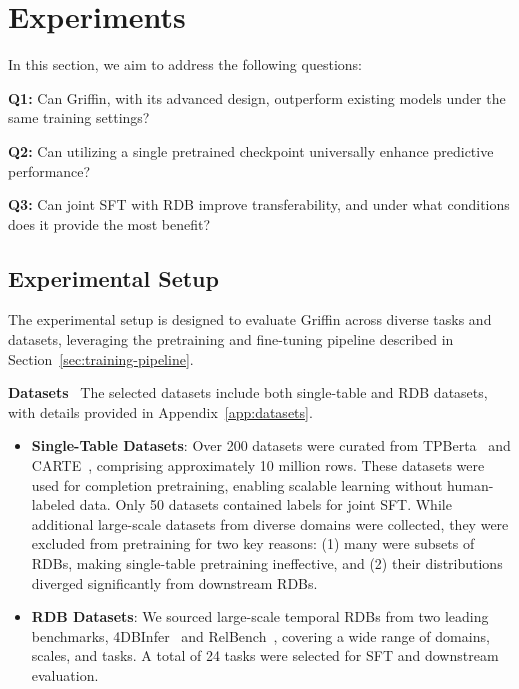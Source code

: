 \documentclass{article}
\theoremstyle{plain}
\theoremstyle{definition}
\theoremstyle{remark}
\begin{document}
\section{Experiments}

In this section, we aim to address the following questions:  

\textbf{Q1:} Can Griffin, with its advanced design, outperform existing models under the same training settings?  
\vspace{-0.1cm}

\textbf{Q2:} Can utilizing a single pretrained checkpoint universally enhance predictive performance?  
\vspace{-0.1cm}

\textbf{Q3:} Can joint SFT with RDB improve transferability, and under what conditions does it provide the most benefit?  
\vspace{-0.1cm}

\vspace*{-0.1cm}
\subsection{Experimental Setup}

The experimental setup is designed to evaluate Griffin across diverse tasks and datasets, leveraging the pretraining and fine-tuning pipeline described in Section~\ref{sec:training-pipeline}. 

\textbf{Datasets}~
The selected datasets include both single-table and RDB datasets, with details provided in Appendix~\ref{app:datasets}.  
\begin{itemize}[itemsep=2pt,topsep=-2pt,parsep=0pt,leftmargin=10pt]
    \item \textbf{Single-Table Datasets}: Over 200 datasets were curated from TPBerta~\citep{yan2024making} and CARTE~\cite{kim2024carte}, comprising approximately 10 million rows. These datasets were used for completion pretraining, enabling scalable learning without human-labeled data. Only 50 datasets contained labels for joint SFT. While additional large-scale datasets from diverse domains were collected, they were excluded from pretraining for two key reasons: (1) many were subsets of RDBs, making single-table pretraining ineffective, and (2) their distributions diverged significantly from downstream RDBs.  
    \item \textbf{RDB Datasets}: We sourced large-scale temporal RDBs from two leading benchmarks, 4DBInfer~\cite{wang20244dbinfer} and RelBench~\citep{robinson2024relbench}, covering a wide range of domains, scales, and tasks. A total of 24 tasks were selected for SFT and downstream evaluation.  
\end{itemize}  
\end{document}
